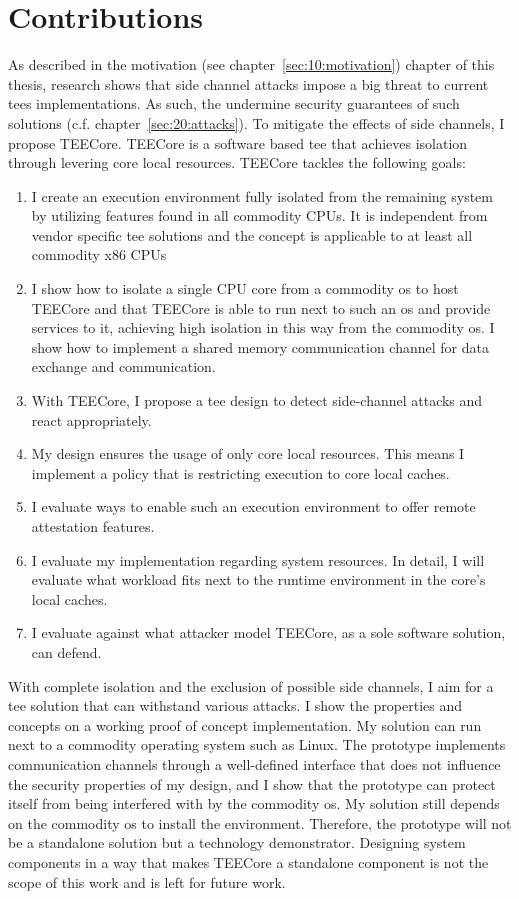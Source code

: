 \section{Contributions}
\label{sec:10:contributions}
As described in the motivation (see chapter~\ref{sec:10:motivation}) chapter of
this thesis, research shows that side channel attacks impose a big threat to
current \glspl{tee} implementations. As such, the undermine security guarantees
of such solutions (c.f. chapter~\ref{sec:20:attacks}). To mitigate the effects
of side channels, I propose TEECore. TEECore is a software based \gls{tee} that
achieves isolation through levering core local resources. TEECore tackles the
following goals:

\begin{enumerate}
  \item I create an execution environment fully isolated from the remaining
    system by utilizing features found in all commodity CPUs. It is independent
    from vendor specific \gls{tee} solutions and the concept is applicable to at
    least all commodity x86 CPUs
  \item I show how to isolate a single CPU core from a commodity \gls{os} to
    host TEECore and that TEECore is able to run next to such an \gls{os} and
    provide services to it, achieving high isolation in this way from the
    commodity \gls{os}. I show how to implement a shared memory communication
    channel for data exchange and communication.
  \item With TEECore, I propose a \gls{tee} design to detect side-channel
    attacks and react appropriately.
  \item My design ensures the usage of only core local resources. This means
    I implement a policy that is restricting execution to core local caches.
  \item I evaluate ways to enable such an execution environment to offer
    remote attestation features.
  \item I evaluate my implementation regarding system resources. In detail,
    I will evaluate what workload fits next to the runtime
    environment in the core's local caches.
  \item I evaluate against what attacker model TEECore, as a sole software
    solution, can defend.
\end{enumerate}

With complete isolation and the exclusion of possible side channels, I aim for a
\gls{tee} solution that can withstand various attacks. I show the properties and
concepts on a working proof of concept implementation. My solution can run next
to a commodity operating system such as Linux. The prototype implements
communication channels through a well-defined interface that does not influence
the security properties of my design, and I show that the prototype can protect
itself from being interfered with by the commodity \gls{os}. My solution still
depends on the commodity \gls{os} to install the environment. Therefore, the
prototype will not be a standalone solution but a technology demonstrator.
Designing system components in a way that makes TEECore a standalone component
is not the scope of this work and is left for future work.
